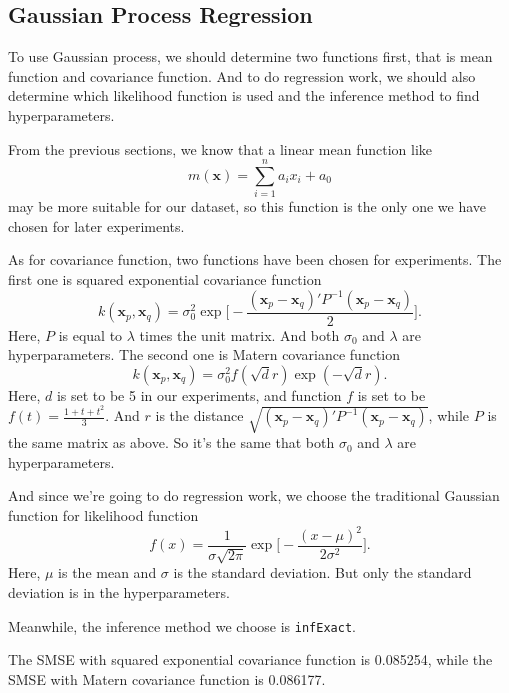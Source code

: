 \documentclass[a4paper]{article}
\newcommand{\bfx}{\mathbf{x}}
\begin{document}
\subsection{Gaussian Process Regression}
To use Gaussian process, we should determine two functions first, that is mean function and covariance function. And to do regression work, we should also determine which likelihood function is used and the inference method to find hyperparameters.

From the previous sections, we know that a linear mean function like
\begin{equation}
m(\bfx)=\sum_{i=1}^n a_ix_i + a_0
\end{equation}
may be more suitable for our dataset, so this function is the only one we have chosen for later experiments.

As for covariance function, two functions have been chosen for experiments. The first one is squared exponential covariance function
\begin{equation}
k(\bfx_p,\bfx_q)=\sigma_0^2\exp\Big[-\frac{(\bfx_p-\bfx_q)'P^{-1}(\bfx_p-\bfx_q)}{2}\Big].
\end{equation}
Here, $P$ is equal to $\lambda$ times the unit matrix. And both $\sigma_0$ and $\lambda$ are hyperparameters. The second one is Matern covariance function
\begin{equation}
k(\bfx_p,\bfx_q)=\sigma_0^2f(\sqrt{d}r)\exp(-\sqrt{d}r).
\end{equation}
Here, $d$ is set to be 5 in our experiments, and function $f$ is set to be $f(t)=\frac{1+t+t^2}{3}$. And $r$ is the distance $\sqrt{(\bfx_p-\bfx_q)'P^{-1}(\bfx_p-\bfx_q)}$, while $P$ is the same matrix as above. So it's the same that both $\sigma_0$ and $\lambda$ are hyperparameters.

And since we're going to do regression work, we choose the traditional Gaussian function for likelihood function
\begin{equation}
f(x)=\frac{1}{\sigma\sqrt{2\pi}} \exp\Big[ -\frac{(x-\mu)^2}{2\sigma^2} \Big].
\end{equation}
Here, $\mu$ is the mean and $\sigma$ is the standard deviation. But only the standard deviation is in the hyperparameters.

Meanwhile, the inference method we choose is \texttt{infExact}.

The SMSE with squared exponential covariance function is 0.085254, while the SMSE with Matern covariance function is 0.086177.


\end{document}
